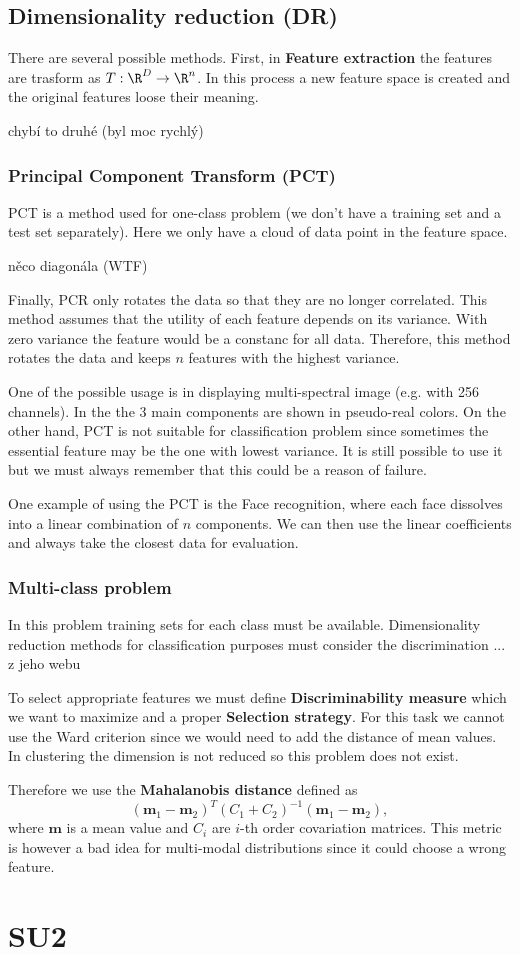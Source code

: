 \section{Dimensionality reduction (DR)}
There are several possible methods. First, in \textbf{Feature extraction} the features are trasform as $T: \R^D\to\R^n$. In this process a new feature space is created and the original features loose their meaning.

chybí to druhé (byl moc rychlý)

\subsection{Principal Component Transform (PCT)}
PCT is a method used for one-class problem (we don't have a training set and a test set separately). Here we only have a cloud of data point in the feature space.

něco diagonála (WTF)

Finally, PCR only rotates the data so that they are no longer correlated. This method assumes that the utility of each feature depends on its variance. With zero variance the feature would be a constanc for all data. Therefore, this method rotates the data and keeps $n$ features with the highest variance.

One of the possible usage is in displaying multi-spectral image (e.g. with 256 channels). In the the 3 main components are shown in pseudo-real colors. On the other hand, PCT is not suitable for classification problem since sometimes the essential feature may be the one with lowest variance. It is still possible to use it but we must always remember that this could be a reason of failure.

One example of using the PCT is the Face recognition, where each face dissolves into a linear combination of $n$ components. We can then use the linear coefficients and always take the closest data for evaluation.

\subsection{Multi-class problem}
In this problem training sets for each class must be available. Dimensionality reduction methods for classification purposes must consider the discrimination ... z jeho webu

To select appropriate features we must define \textbf{Discriminability measure} which we want to maximize and a proper \textbf{Selection strategy}.
For this task we cannot use the Ward criterion since we would need to add the distance of mean values. In clustering the dimension is not reduced so this problem does not exist.

Therefore we use the \textbf{Mahalanobis distance} defined as
$$ (\textbf{m}_1-\textbf{m}_2)^T (C_1+C_2)^{-1}(\textbf{m}_1-\textbf{m}_2),$$
where $\textbf{m}$ is a mean value and $C_i$ are $i$-th order covariation matrices.
This metric is however a bad idea for multi-modal distributions since it could choose a wrong feature.

\chapter{SU2}
